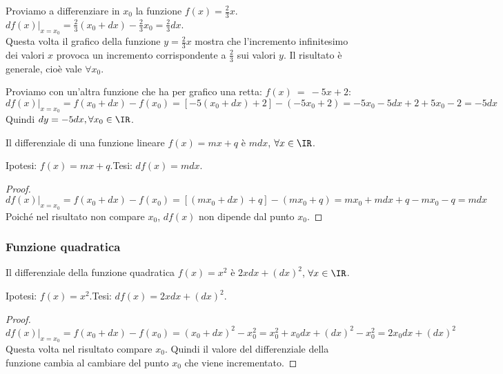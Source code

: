 \begin{esempio}
 Proviamo a differenziare in $x_0$ la funzione $f(x)=\frac{2}{3}x$.\\
\( df(x)|_{x=x_0}=\frac{2}{3}(x_0+dx)-\frac{2}{3}x_0=\frac{2}{3}dx\).\\
Questa volta il grafico della funzione $y=\frac{2}{3}x$ mostra che
l'incremento infinitesimo dei valori $x$ provoca un incremento corrispondente 
a $\frac{2}{3}$ sui valori $y$. Il risultato è generale, cioè vale $\forall x_0$.
\end{esempio}
\begin{esempio}
Proviamo con un'altra funzione che ha per grafico una retta: \(f(x)~=~-5x+2\):
\[
df(x)|_{x=x_0}= f(x_0+dx)-f(x_0)=[-5(x_0+dx)+2]-(-5x_0+2)=-5x_0-5dx+2+5x_0-2=-5dx
\]
Quindi $dy=-5dx, \forall x_0 \in \IR$. 
\end{esempio}

\begin{teorema}
 Il differenziale di una funzione lineare $f(x)=mx+q$ è $mdx$, $\forall x\in \IR$.
\end{teorema}

\noindent Ipotesi: \(f(x)=mx+q\).\tab Tesi: \(df(x)=mdx\).

\begin{proof}
\[
 df(x)|_{x=x_0}= f(x_0+dx)-f(x_0)=[(mx_0+dx)+q]-(mx_0+q)=mx_0+mdx+q-mx_0-q=mdx
\]
Poiché nel risultato non compare $x_0$, $df(x)$ non dipende dal punto $x_0$.
\end{proof}

\subsubsection{Funzione quadratica}
\label{subsubsec:diff01_diffquad}

\begin{teorema}
 Il differenziale della funzione quadratica $f(x)=x^2$ è $2xdx+(dx)^2$, $\forall x\in \IR$.
\end{teorema}

\noindent Ipotesi: \(f(x)=x^2\).\tab Tesi: \(df(x)=2xdx+(dx)^2\).

\begin{proof}
\[
 df(x)|_{x=x_0}= f(x_0+dx)-f(x_0)=(x_0+dx)^2-x_0^2=x_0^2+x_0dx+(dx)^2-x_0^2=2x_0dx+(dx)^2
\]
Questa volta nel risultato compare $x_0$. Quindi il valore del differenziale 
della funzione cambia al cambiare del punto $x_0$ che viene incrementato.
\end{proof}



